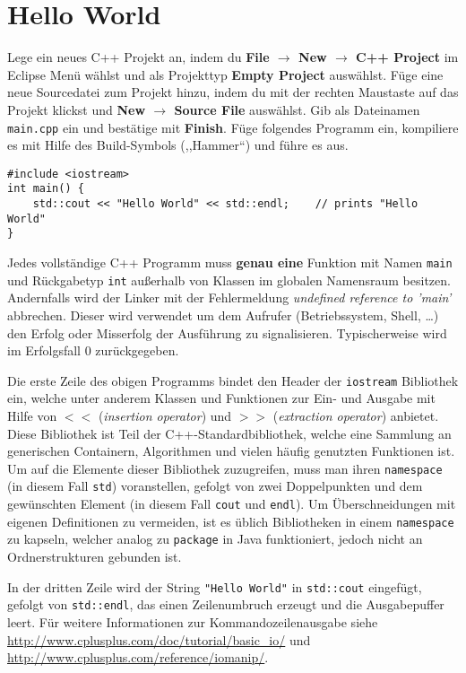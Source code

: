 \section{Hello World}
Lege ein neues C++ Projekt an, indem du \textbf{File $\rightarrow$ New $\rightarrow$ C++ Project} im Eclipse Menü wählst und als Projekttyp \textbf{Empty Project} auswählst.
Füge eine neue Sourcedatei zum Projekt hinzu, indem du mit der rechten Maustaste auf das Projekt klickst und \textbf{New $\rightarrow$ Source File} auswählst.
Gib als Dateinamen \texttt{main.cpp} ein und bestätige mit \textbf{Finish}.
Füge folgendes Programm ein, kompiliere es mit Hilfe des Build-Symbols (,,Hammer``) und führe es aus.

\begin{lstlisting}
#include <iostream>
int main() {
	std::cout << "Hello World" << std::endl;	// prints "Hello World"
}
\end{lstlisting}

Jedes vollständige C++ Programm muss \textbf{genau eine} Funktion mit Namen \texttt{main} und Rückgabetyp \texttt{int} außerhalb von Klassen im globalen Namensraum besitzen. Andernfalls wird der Linker mit der Fehlermeldung \emph{undefined reference to 'main'} abbrechen.
Dieser wird verwendet um dem Aufrufer (Betriebssystem, Shell, \dots) den Erfolg oder Misserfolg der Ausführung zu signalisieren.
Typischerweise wird im Erfolgsfall 0 zurückgegeben.

Die erste Zeile des obigen Programms bindet den Header der \texttt{iostream} Bibliothek ein, welche unter anderem Klassen und Funktionen zur Ein- und Ausgabe mit Hilfe von $<<$ (\emph{insertion operator}) und $>>$ (\emph{extraction operator}) anbietet.
Diese Bibliothek ist Teil der C++-Standardbibliothek, welche eine Sammlung an generischen Containern, Algorithmen und vielen häufig genutzten Funktionen ist.
Um auf die Elemente dieser Bibliothek zuzugreifen, muss man ihren \texttt{namespace} (in diesem Fall \texttt{std}) voranstellen, gefolgt von zwei Doppelpunkten und dem gewünschten Element (in diesem Fall \texttt{cout} und \texttt{endl}).
Um Überschneidungen mit eigenen Definitionen zu vermeiden, ist es üblich Bibliotheken in einem \texttt{namespace} zu kapseln, welcher analog zu \texttt{package} in Java funktioniert, jedoch nicht an Ordnerstrukturen gebunden ist.

In der dritten Zeile wird der String \texttt{"Hello World"} in \texttt{std::cout} eingefügt, gefolgt von \texttt{std::endl}, das einen Zeilenumbruch erzeugt und die Ausgabepuffer leert. Für weitere Informationen zur Kommandozeilenausgabe siehe \url{http://www.cplusplus.com/doc/tutorial/basic_io/} und \url{http://www.cplusplus.com/reference/iomanip/}.

